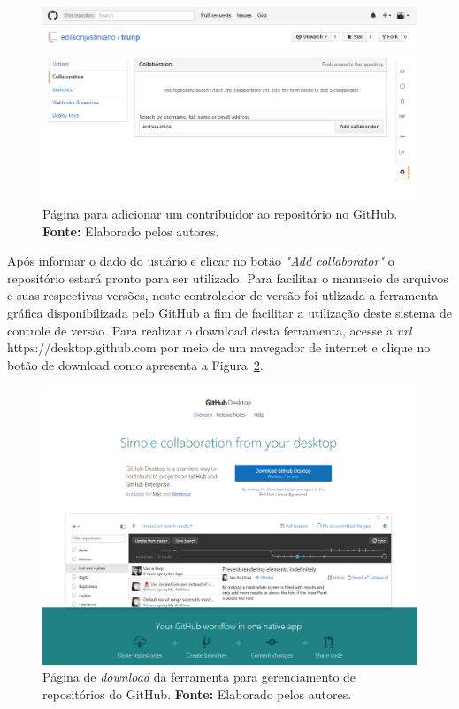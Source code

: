 \captionsetup[figure]{list=no}
\begin{figure}[h!]
	\centerline{\includegraphics[scale=0.5]{./imagens/apendices/pagina-adicionar-colaborador-ao-repositorio.png}}
	\caption[Página para adicionar um contribuidor ao repositório no GitHub.]
	{Página para adicionar um contribuidor ao repositório no GitHub. \textbf{Fonte:} Elaborado pelos autores.}
	\label{fig:ap3:pagina_adicionar_colaborador_repositorio_github}
\end{figure}

Após informar o dado do usuário e clicar no botão \textit{"Add collaborator"} o repositório estará pronto para ser utilizado. Para facilitar o manuseio de arquivos e suas respectivas versões, neste controlador de versão foi utlizada a ferramenta gráfica disponibilizada pelo GitHub a fim de facilitar a utilização deste sistema de controle de versão. Para realizar o download desta ferramenta, acesse a \textit{url} https://desktop.github.com por meio de um navegador de internet e clique no botão de download como apresenta a Figura~\ref{fig:ap3:pagina_download_github_para_windows}.

\captionsetup[figure]{list=no}
\begin{figure}[h!]
	\centerline{\includegraphics[scale=0.4]{./imagens/apendices/pagina-download-github.png}}
	\caption[Página de \textit{download} da ferramenta para gerenciamento de repositórios do GitHub.]
	{Página de \textit{download} da ferramenta para gerenciamento de repositórios do GitHub. \textbf{Fonte:} Elaborado pelos autores.}
	\label{fig:ap3:pagina_download_github_para_windows}
\end{figure}

